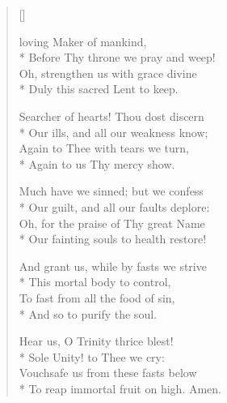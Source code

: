 \newHymn


\begin{verse}[\versewidth]

 loving Maker of mankind,\\*
Before Thy throne we pray and weep!\\
Oh, strengthen us with grace divine\\*
Duly this sacred Lent to keep.

\pointorig

Searcher of hearts! Thou dost discern\\*
Our ills, and all our weakness know;\\
Again to Thee with tears we turn,\\*
Again to us Thy mercy show.

Much have we sinned; but we confess\\*
Our guilt, and all our faults deplore:\\
Oh, for the praise of Thy great Name\\*
Our fainting souls to health restore!

And grant us, while by fasts we strive\\*
This mortal body to control,\\
To fast from all the food of sin,\\*
And so to purify the soul.

Hear us, O Trinity thrice blest!\\*
Sole Unity! to Thee we cry:\\
Vouchsafe us from these fasts below\\*
To reap immortal fruit on high.
Amen.

\end{verse}


